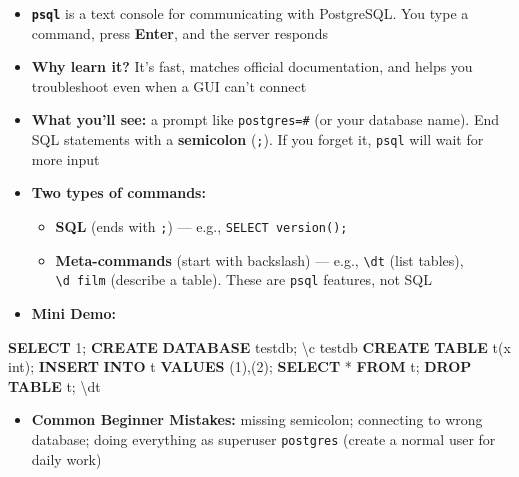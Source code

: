 \documentclass[
  letterpaper,
  DIV=11,
  numbers=noendperiod]{scrartcl}
\newenvironment{Shaded}{\begin{snugshade}}{\end{snugshade}}
\newcommand{\DataTypeTok}[1]{\textcolor[rgb]{0.68,0.00,0.00}{#1}}
\newcommand{\DecValTok}[1]{\textcolor[rgb]{0.68,0.00,0.00}{#1}}
\newcommand{\KeywordTok}[1]{\textcolor[rgb]{0.00,0.23,0.31}{\textbf{#1}}}
\newcommand{\NormalTok}[1]{\textcolor[rgb]{0.00,0.23,0.31}{#1}}
\newcommand{\OperatorTok}[1]{\textcolor[rgb]{0.37,0.37,0.37}{#1}}
\providecommand{\tightlist}{%
  \setlength{\itemsep}{0pt}\setlength{\parskip}{0pt}}\usepackage{longtable,booktabs,array}
\begin{document}
\begin{itemize}
\tightlist
\item
  \textbf{\texttt{psql}} is a text console for communicating with
  PostgreSQL. You type a command, press \textbf{Enter}, and the server
  responds
\item
  \textbf{Why learn it?} It's fast, matches official documentation, and
  helps you troubleshoot even when a GUI can't connect
\item
  \textbf{What you'll see:} a prompt like \texttt{postgres=\#} (or your
  database name). End SQL statements with a \textbf{semicolon}
  (\texttt{;}). If you forget it, \texttt{psql} will wait for more input
\item
  \textbf{Two types of commands:}

  \begin{itemize}
  \tightlist
  \item
    \textbf{SQL} (ends with \texttt{;}) --- e.g.,
    \texttt{SELECT\ version();}
  \item
    \textbf{Meta-commands} (start with backslash) --- e.g.,
    \texttt{\textbackslash{}dt} (list tables),
    \texttt{\textbackslash{}d\ film} (describe a table). These are
    \texttt{psql} features, not SQL
  \end{itemize}
\item
  \textbf{Mini Demo:}
\end{itemize}

\begin{Shaded}
\begin{Highlighting}[]
\KeywordTok{SELECT} \DecValTok{1}\NormalTok{;}
\KeywordTok{CREATE} \KeywordTok{DATABASE}\NormalTok{ testdb;}
\NormalTok{\textbackslash{}c testdb}
\KeywordTok{CREATE} \KeywordTok{TABLE}\NormalTok{ t(x }\DataTypeTok{int}\NormalTok{);}
\KeywordTok{INSERT} \KeywordTok{INTO}\NormalTok{ t }\KeywordTok{VALUES}\NormalTok{ (}\DecValTok{1}\NormalTok{),(}\DecValTok{2}\NormalTok{);}
\KeywordTok{SELECT} \OperatorTok{*} \KeywordTok{FROM}\NormalTok{ t;}
\KeywordTok{DROP} \KeywordTok{TABLE}\NormalTok{ t;}
\NormalTok{\textbackslash{}dt}
\end{Highlighting}
\end{Shaded}

\begin{itemize}
\tightlist
\item
  \textbf{Common Beginner Mistakes:} missing semicolon; connecting to
  wrong database; doing everything as superuser \texttt{postgres}
  (create a normal user for daily work)
\end{itemize}
\end{document}
